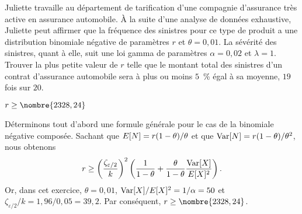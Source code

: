 \begin{exercice}
  \label{ex:stabilite:rBNC}
  Juliette travaille au département de tarification d'une compagnie
  d'assurance très active en assurance automobile. À la suite d'une
  analyse de données exhaustive, Juliette peut affirmer que la
  fréquence des sinistres pour ce type de produit a une distribution
  binomiale négative de paramètres $r$ et $\theta = 0,01$. La sévérité
  des sinistres, quant à elle, suit une loi gamma de paramètres
  $\alpha = 0,02$ et $\lambda = 1$. Trouver la plus petite valeur de
  $r$ telle que le montant total des sinistres d'un contrat
  d'assurance automobile sera à plus ou moins $5$~\% égal à sa moyenne,
  $19$ fois sur $20$.
  \begin{rep}
    $r \geq \nombre{2328,24}$
  \end{rep}
  \begin{sol}
    Déterminons tout d'abord une formule générale pour le cas de la
    binomiale négative composée. Sachant que
    $E [ N ] = r(1 - \theta)/\theta$ et que
    $\operatorname{Var} [ N ] = r (1 - \theta)/\theta^2$, nous obtenons
    \begin{displaymath}
      r \geq
      \left(
        \frac{\zeta_{\varepsilon/2}}{k}
      \right)^2
      \left(
        \frac{1}{1 - \theta} +
        \frac{\theta}{1-\theta} \frac{\operatorname{Var} [ X ]}{E [ X ]^2}
      \right).
    \end{displaymath}
    Or, dans cet exercice, $\theta = 0,01$, $\operatorname{Var} [ X ]/E [ X ]^2 =
    1/\alpha = 50$ et $\zeta_{\varepsilon/2}/k = 1,96/0,05 = 39,2$. Par
    conséquent, $r \geq \nombre{2328,24}$.
  \end{sol}
\end{exercice}

